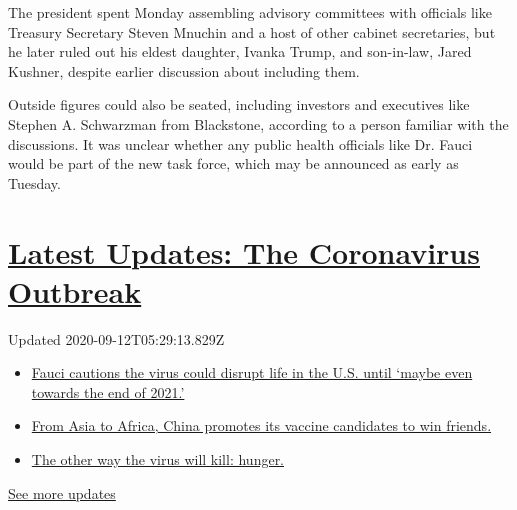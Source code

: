 The president spent Monday assembling advisory committees with officials
like Treasury Secretary Steven Mnuchin and a host of other cabinet
secretaries, but he later ruled out his eldest daughter, Ivanka Trump,
and son-in-law, Jared Kushner, despite earlier discussion about
including them.

Outside figures could also be seated, including investors and executives
like Stephen A. Schwarzman from Blackstone, according to a person
familiar with the discussions. It was unclear whether any public health
officials like Dr. Fauci would be part of the new task force, which may
be announced as early as Tuesday.

\hypertarget{latest-updates-the-coronavirus-outbreak}{%
\section{\texorpdfstring{\href{https://www.nytimes3xbfgragh.onion/2020/09/11/world/covid-19-coronavirus.html?action=click\&pgtype=Article\&state=default\&region=MAIN_CONTENT_1\&context=storylines_live_updates}{Latest
Updates: The Coronavirus
Outbreak}}{Latest Updates: The Coronavirus Outbreak}}\label{latest-updates-the-coronavirus-outbreak}}

Updated 2020-09-12T05:29:13.829Z

\begin{itemize}
\tightlist
\item
  \href{https://www.nytimes3xbfgragh.onion/2020/09/11/world/covid-19-coronavirus.html?action=click\&pgtype=Article\&state=default\&region=MAIN_CONTENT_1\&context=storylines_live_updates\#link-dfb8a16}{Fauci
  cautions the virus could disrupt life in the U.S. until `maybe even
  towards the end of 2021.'}
\item
  \href{https://www.nytimes3xbfgragh.onion/2020/09/11/world/covid-19-coronavirus.html?action=click\&pgtype=Article\&state=default\&region=MAIN_CONTENT_1\&context=storylines_live_updates\#link-7104d154}{From
  Asia to Africa, China promotes its vaccine candidates to win friends.}
\item
  \href{https://www.nytimes3xbfgragh.onion/2020/09/11/world/covid-19-coronavirus.html?action=click\&pgtype=Article\&state=default\&region=MAIN_CONTENT_1\&context=storylines_live_updates\#link-393ad215}{The
  other way the virus will kill: hunger.}
\end{itemize}

\href{https://www.nytimes3xbfgragh.onion/2020/09/11/world/covid-19-coronavirus.html?action=click\&pgtype=Article\&state=default\&region=MAIN_CONTENT_1\&context=storylines_live_updates}{See
more updates}

